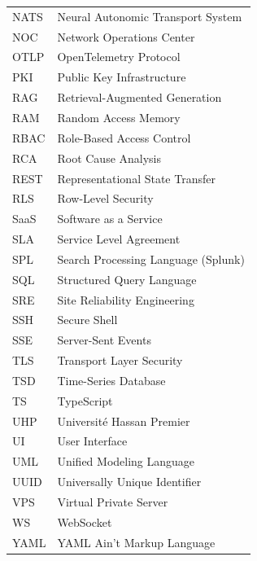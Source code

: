 \begin{longtable}{@{}lp{11cm}@{}}
NATS  & Neural Autonomic Transport System \\
NOC   & Network Operations Center \\
OTLP  & OpenTelemetry Protocol \\
PKI   & Public Key Infrastructure \\
RAG   & Retrieval-Augmented Generation \\
RAM   & Random Access Memory \\
RBAC  & Role-Based Access Control \\
RCA   & Root Cause Analysis \\
REST  & Representational State Transfer \\
RLS   & Row-Level Security \\
SaaS  & Software as a Service \\
SLA   & Service Level Agreement \\
SPL   & Search Processing Language (Splunk) \\
SQL   & Structured Query Language \\
SRE   & Site Reliability Engineering \\
SSH   & Secure Shell \\
SSE   & Server-Sent Events \\
TLS   & Transport Layer Security \\
TSD   & Time-Series Database \\
TS    & TypeScript \\
UHP   & Université Hassan Premier \\
UI    & User Interface \\
UML   & Unified Modeling Language \\
UUID  & Universally Unique Identifier \\
VPS   & Virtual Private Server \\
WS    & WebSocket \\
YAML  & YAML Ain't Markup Language \\
\end{longtable}
